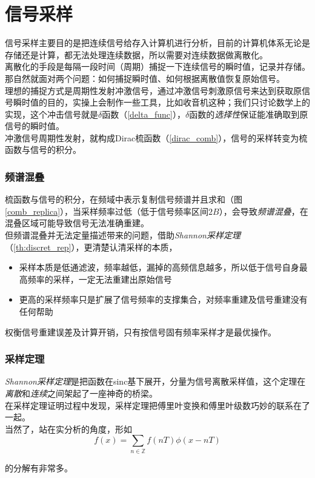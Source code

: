 \section{信号采样}

信号采样主要目的是把连续信号给存入计算机进行分析，目前的计算机体系无论是存储还是计算，都无法处理连续数据，所以需要对连续数据做离散化。\\

离散化的手段是每隔一段时间（周期）捕捉一下连续信号的瞬时值，记录并存储。那自然就面对两个问题：如何捕捉瞬时值、如何根据离散值恢复原始信号。\\

理想的捕捉方式是周期性发射冲激信号，通过冲激信号刺激原信号来达到获取原信号瞬时值的目的，实操上会制作一些工具，比如收音机这种；我们只讨论数学上的实现，这个冲击信号就是$\delta$函数（\ref{delta_func}），$\delta$函数的\textit{选择性}保证能准确取到原信号的瞬时值。\\

冲激信号周期性发射，就构成Dirac梳函数（\ref{dirac_comb}），信号的采样转变为梳函数与信号的积分。

\subsubsection*{频谱混叠}

梳函数与信号的积分，在频域中表示复制信号频谱并且求和（图\ref{comb_replica}），当采样频率过低（低于信号频率区间$2B$），会导致\textit{频谱混叠}，在混叠区域可能导致信号无法准确重建。\\

但频谱混叠并无法定量描述带来的问题，借助\textit{Shannon采样定理}（\ref{th:discret_rep}），更清楚认清采样的本质，
\begin{itemize}
	\item 采样本质是低通滤波，频率越低，漏掉的高频信息越多，所以低于信号自身最高频率的采样，一定无法重建出原始信号
	\item 更高的采样频率只是扩展了信号频率的支撑集合，对频率重建及信号重建没有任何帮助
\end{itemize}

权衡信号重建误差及计算开销，只有按信号固有频率采样才是最优操作。

\subsubsection*{采样定理}

\textit{Shannon采样定理}是把函数在sinc基下展开，分量为信号离散采样值，这个定理在\textit{离散}和\textit{连续}之间架起了一座神奇的桥梁。\\

在采样定理证明过程中发现，采样定理把傅里叶变换和傅里叶级数巧妙的联系在了一起。\\

当然了，站在实分析的角度，形如
$$
	f(x) = \sum_{n\in \mathbb{Z}}f(nT)\phi(x-nT)
$$

的分解有非常多。